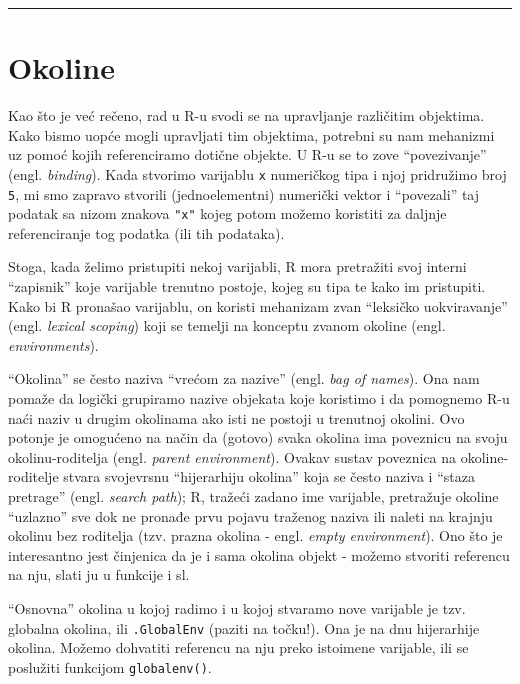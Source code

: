 \documentclass[]{book}
\theoremstyle{definition}
\theoremstyle{definition}
\theoremstyle{definition}
\theoremstyle{remark}
\begin{document}
\begin{center}\rule{0.5\linewidth}{\linethickness}\end{center}

\section{Okoline}\label{okoline}

Kao što je već rečeno, rad u R-u svodi se na upravljanje različitim
objektima. Kako bismo uopće mogli upravljati tim objektima, potrebni su
nam mehanizmi uz pomoć kojih referenciramo dotične objekte. U R-u se to
zove ``povezivanje'' (engl. \emph{binding}). Kada stvorimo varijablu
\texttt{x} numeričkog tipa i njoj pridružimo broj \texttt{5}, mi smo
zapravo stvorili (jednoelementni) numerički vektor i ``povezali'' taj
podatak sa nizom znakova \texttt{"x"} kojeg potom možemo koristiti za
daljnje referenciranje tog podatka (ili tih podataka).

Stoga, kada želimo pristupiti nekoj varijabli, R mora pretražiti svoj
interni ``zapisnik'' koje varijable trenutno postoje, kojeg su tipa te
kako im pristupiti. Kako bi R pronašao varijablu, on koristi mehanizam
zvan ``leksičko uokviravanje'' (engl. \emph{lexical scoping}) koji se
temelji na konceptu zvanom okoline (engl. \emph{environments}).

``Okolina'' se često naziva ``vrećom za nazive'' (engl. \emph{bag of
names}). Ona nam pomaže da logički grupiramo nazive objekata koje
koristimo i da pomognemo R-u naći naziv u drugim okolinama ako isti ne
postoji u trenutnoj okolini. Ovo potonje je omogućeno na način da
(gotovo) svaka okolina ima poveznicu na svoju okolinu-roditelja (engl.
\emph{parent environment}). Ovakav sustav poveznica na okoline-roditelje
stvara svojevrsnu ``hijerarhiju okolina'' koja se često naziva i ``staza
pretrage'' (engl. \emph{search path}); R, tražeći zadano ime varijable,
pretražuje okoline ``uzlazno'' sve dok ne pronađe prvu pojavu traženog
naziva ili naleti na krajnju okolinu bez roditelja (tzv. prazna okolina
- engl. \emph{empty environment}). Ono što je interesantno jest
činjenica da je i sama okolina objekt - možemo stvoriti referencu na
nju, slati ju u funkcije i sl.

``Osnovna'' okolina u kojoj radimo i u kojoj stvaramo nove varijable je
tzv. globalna okolina, ili \texttt{.GlobalEnv} (paziti na točku!). Ona
je na dnu hijerarhije okolina. Možemo dohvatiti referencu na nju preko
istoimene varijable, ili se poslužiti funkcijom \texttt{globalenv()}.
\end{document}
